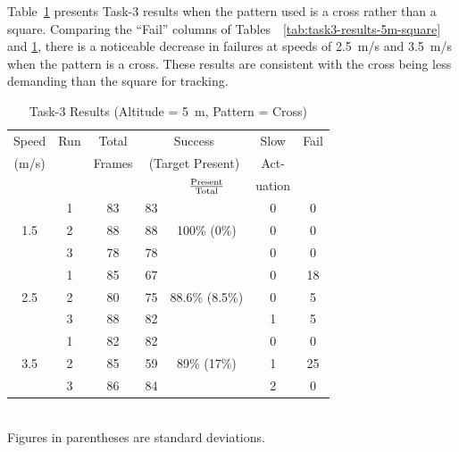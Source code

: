Table~\ref{tab:task3-results-5m-cross} presents Task-3 results when
the pattern used is a cross rather than a square.  Comparing the
``Fail'' columns of Tables~~\ref{tab:task3-results-5m-square} and
\ref{tab:task3-results-5m-cross}, there is a noticeable decrease in
failures at speeds of 2.5~m/s and 3.5~m/s when the pattern is a cross.
These results are consistent with the cross being less demanding than
the square for tracking.

\begin{table}
\centering\small
\begin{tabular}{|c|c|c|c|c|c|c|}
\hline
Speed & Run & Total & \multicolumn{2}{c|}{Success} & Slow & Fail\\
(m/s) &  & Frames  & \multicolumn{2}{c|}{\footnotesize (Target Present)}& Act-  &  \\
\cline{5-5} 
      &  &         &         & $\rm \frac{Present}{Total}$ & uation  & \\ 
\hline
    & 1 & 83 & 83 &    & 0 & 0 \\
1.5 & 2 & 88 & 88 & 100\% \scriptsize{(0\%)} & 0 & 0 \\
    & 3 & 78 & 78 &    & 0 & 0 \\
\hline
    & 1 & 85 & 67 &        & 0 & 18 \\
2.5 & 2 & 80 & 75 & 88.6\% \scriptsize{(8.5\%)} & 0 &  5 \\
    & 3 & 88 & 82 &        & 1 &  5 \\
\hline
    & 1 & 82 & 82 &        & 0 &  0 \\
3.5 & 2 & 85 & 59 & 89\% \scriptsize{(17\%)} & 1 & 25 \\
    & 3 & 86 & 84 &        & 2 &  0 \\
\hline
\end{tabular}
\begin{captext}
\centering \\[0.1cm] Figures in parentheses are standard deviations. \\
\end{captext}
\caption{Task-3 Results {\footnotesize (Altitude = 5~m, Pattern = Cross)}}
\label{tab:task3-results-5m-cross}
\end{table}

